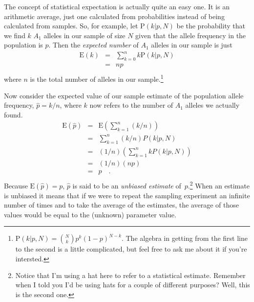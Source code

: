 The concept of statistical expectation is actually quite an easy
one. It is an arithmetic average, just one calculated from
probabilities instead of being calculated from samples. So, for
example, let $\mbox{P}(k|p,N)$ be the probability that we find $k$
$A_1$ alleles in our sample of size $N$ given that the allele
frequency in the population is $p$. Then the {\it expected number\/}
of $A_1$ alleles in our sample is just
\begin{eqnarray*}
\mbox{E}(k) &=& \sum_{k=0}^n k \mbox{P}(k|p,N) \\
     &=& n p \quad  \\
\end{eqnarray*}
where $n$ is the total number of alleles in our
sample.\footnote{$\mbox{P}(k|p,N) = {N \choose k}p^k(1-p)^{N-k}$. The
  algebra in getting from the first line to the second is a little
  complicated, but feel free to ask me about it if you're intersted.}

Now consider the expected value of our sample estimate of the
population allele frequency, $\hat p = k/n$, where $k$ now refers to
the number of $A_1$ alleles we actually found.
\begin{eqnarray*}
\mbox{E}(\hat p) &=& \mbox{E}\left(\sum_{k=1}^n (k/n)\right) \\
          &=& \sum_{k=1}^n (k/n) P(k|p,N) \\
          &=& (1/n)\left(\sum_{k=1}^n k P(k|p,N)\right) \\
          &=& (1/n)(n p) \\
          &=& p \quad . \\
\end{eqnarray*}
Because $\mbox{E}(\hat p) = p$, $\hat p$ is said to be an {\it
  unbiased estimate} of~$p$.\footnote{Notice
  that I'm using a hat here to refer to a statistical
  estimate. Remember when I told you I'd be using hats for a couple of
  different purposes? Well, this is the second one.} When an estimate
is unbiased it means that if we were to repeat the sampling experiment
an infinite number of times and to take the average of the estimates,
the average of those values would be equal to the (unknown) parameter
value.

